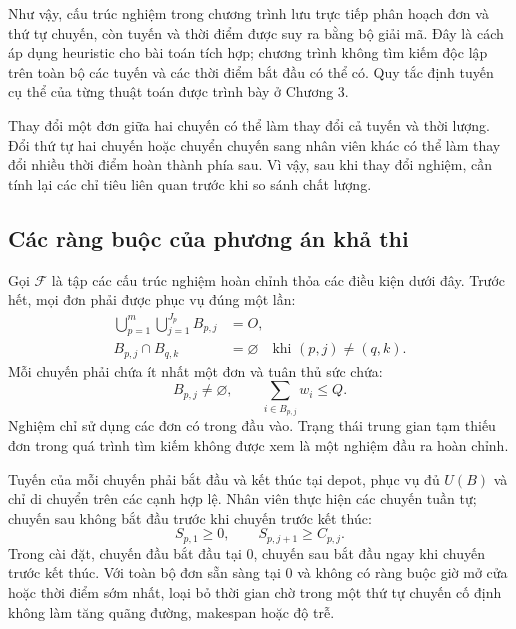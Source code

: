 Như vậy, cấu trúc nghiệm trong chương trình lưu trực tiếp phân hoạch đơn và thứ tự chuyến, còn tuyến và thời điểm được suy ra bằng bộ giải mã. Đây là cách áp dụng heuristic cho bài toán tích hợp; chương trình không tìm kiếm độc lập trên toàn bộ các tuyến và các thời điểm bắt đầu có thể có. Quy tắc định tuyến cụ thể của từng thuật toán được trình bày ở Chương 3.

Thay đổi một đơn giữa hai chuyến có thể làm thay đổi cả tuyến và thời lượng. Đổi thứ tự hai chuyến hoặc chuyển chuyến sang nhân viên khác có thể làm thay đổi nhiều thời điểm hoàn thành phía sau. Vì vậy, sau khi thay đổi nghiệm, cần tính lại các chỉ tiêu liên quan trước khi so sánh chất lượng.

\subsection{Các ràng buộc của phương án khả thi}

Gọi $\mathcal F$ là tập các cấu trúc nghiệm hoàn chỉnh thỏa các điều kiện dưới đây. Trước hết, mọi đơn phải được phục vụ đúng một lần:
\begin{align}
 \bigcup_{p=1}^{m}\bigcup_{j=1}^{J_p}B_{p,j}&=O,\label{eq:model-cover}\\
 B_{p,j}\cap B_{q,k}&=\varnothing\quad\text{khi }(p,j)\neq(q,k).\label{eq:model-disjoint}
\end{align}
Mỗi chuyến phải chứa ít nhất một đơn và tuân thủ sức chứa:
\begin{equation}
 B_{p,j}\neq\varnothing,\qquad \sum_{i\in B_{p,j}}w_i\leq Q.\label{eq:model-capacity}
\end{equation}
Nghiệm chỉ sử dụng các đơn có trong đầu vào. Trạng thái trung gian tạm thiếu đơn trong quá trình tìm kiếm không được xem là một nghiệm đầu ra hoàn chỉnh.

Tuyến của mỗi chuyến phải bắt đầu và kết thúc tại depot, phục vụ đủ $U(B)$ và chỉ di chuyển trên các cạnh hợp lệ. Nhân viên thực hiện các chuyến tuần tự; chuyến sau không bắt đầu trước khi chuyến trước kết thúc:
\begin{equation}
 S_{p,1}\geq0,\qquad S_{p,j+1}\geq C_{p,j}.\label{eq:model-no-overlap}
\end{equation}
Trong cài đặt, chuyến đầu bắt đầu tại $0$, chuyến sau bắt đầu ngay khi chuyến trước kết thúc. Với toàn bộ đơn sẵn sàng tại $0$ và không có ràng buộc giờ mở cửa hoặc thời điểm sớm nhất, loại bỏ thời gian chờ trong một thứ tự chuyến cố định không làm tăng quãng đường, makespan hoặc độ trễ.

